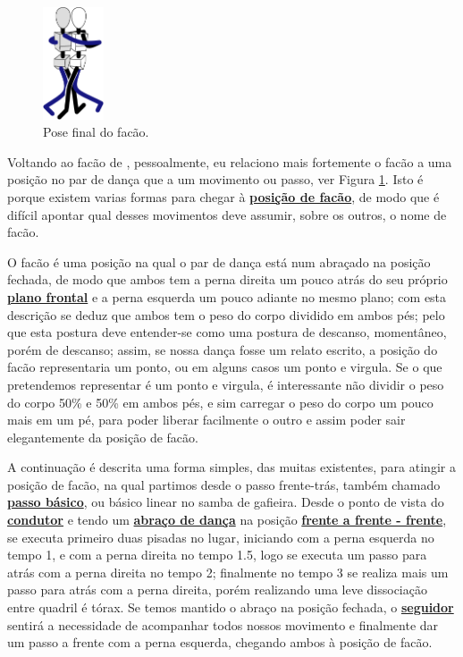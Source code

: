 \begin{figure}
  \vspace{-10pt}
  \centering
    \includegraphics[width=0.16\textwidth]{chapters/cap-historia-passos/facao.eps}
  \caption{Pose final do facão.}
  \label{fig:facaostickman}
  \vspace{-10pt}
\end{figure}
Voltando ao facão de \AnoLivro, pessoalmente, eu relaciono mais fortemente
o facão a uma posição no par de dança que 
a um movimento ou passo, ver Figura \ref{fig:facaostickman}. 
Isto é porque existem varias formas para chegar à \hyperref[def:facao-position]{\textbf{posição de facão}},
de modo que é difícil apontar qual desses movimentos deve assumir, sobre os outros, o nome de facão.

O facão é uma posição na qual o par de dança está num abraçado 
na posição fechada, 
de modo que ambos tem a perna direita um pouco atrás do seu próprio
\hyperref[def:PlanoFrontal]{\textbf{plano frontal}}
e a perna esquerda um pouco adiante no mesmo plano; com esta descrição se deduz 
que ambos tem o peso do corpo dividido em ambos pés; pelo que esta postura
deve entender-se como uma postura de descanso, momentâneo, porém de descanso;
assim, se nossa dança fosse um relato escrito, a posição do facão
representaria um ponto, ou em alguns casos um ponto e virgula.
Se o que pretendemos representar é um ponto e virgula, 
é interessante não dividir o peso do corpo 50\% e 50\% em ambos pés,
e sim carregar o peso do corpo um pouco mais em um pé,
para poder liberar facilmente o outro e assim poder sair elegantemente da posição de facão.  

A continuação é descrita uma forma simples, das muitas existentes, para atingir a posição de facão,
na qual partimos desde o passo frente-trás, também chamado \hyperref[subsec:passobasico]{\textbf{passo básico}}, 
ou básico linear no samba de gafieira. 
Desde o ponto de vista do \hyperref[def:Condutor]{\textbf{condutor}} e 
tendo um \hyperref[def:abracodedanca]{\textbf{abraço de dança}} 
na posição \hyperref[def:fff-position]{\textbf{frente a frente - frente}},
se executa primeiro duas pisadas no lugar, iniciando com a perna esquerda no tempo 1, 
e com a perna direita no tempo 1.5,
logo se executa um passo  para atrás com a perna direita no tempo 2; 
finalmente no tempo 3 se realiza mais um passo para atrás com a perna direita,
porém realizando uma leve dissociação entre quadril é tórax. 
Se temos mantido o abraço na posição fechada, 
o \hyperref[def:Seguidor]{\textbf{seguidor}} sentirá a 
necessidade de acompanhar todos nossos movimento e finalmente dar um passo a frente com a perna esquerda,
chegando ambos à posição de facão.  

